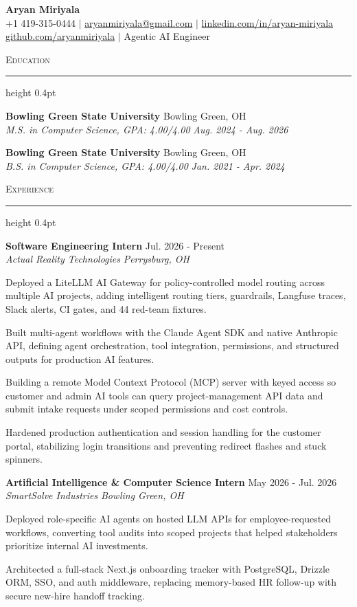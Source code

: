 \documentclass[letterpaper,11pt]{article}
\newcommand{\resumesection}[1]{%
  \par\vspace{2pt}%
  {\large\scshape #1}\par\vspace{2pt}%
  \hrule height 0.4pt\vspace{2pt}%
}
\newcommand{\resumeSubheading}[4]{
  \textbf{#1} \hfill #2\\
  \textit{#3} \hfill \textit{#4}
}
\begin{document}
\begin{center}
  {\LARGE \textbf{Aryan Miriyala}}\\[2pt]
  \small
  +1 419-315-0444 $|$ \href{mailto:aryanmiriyala@gmail.com}{aryanmiriyala@gmail.com} $|$ \href{https://www.linkedin.com/in/aryan-miriyala-7788a21b6/}{linkedin.com/in/aryan-miriyala}\\
  \href{https://github.com/aryanmiriyala}{github.com/aryanmiriyala} $|$ Agentic AI Engineer
\end{center}\vspace{-6pt}

\resumesection{Education}
\resumeSubheading
{Bowling Green State University}{Bowling Green, OH}
{M.S. in Computer Science, GPA: 4.00/4.00}{Aug. 2024 - Aug. 2026}

\resumeSubheading
{Bowling Green State University}{Bowling Green, OH}
{B.S. in Computer Science, GPA: 4.00/4.00}{Jan. 2021 - Apr. 2024}

\resumesection{Experience}
\resumeSubheading
{Software Engineering Intern}{Jul. 2026 - Present}
{Actual Reality Technologies}{Perrysburg, OH}
\begin{tightitemize}
  \item Deployed a LiteLLM AI Gateway for policy-controlled model routing across multiple AI projects, adding intelligent routing tiers, guardrails, Langfuse traces, Slack alerts, CI gates, and 44 red-team fixtures.
  \item Built multi-agent workflows with the Claude Agent SDK and native Anthropic API, defining agent orchestration, tool integration, permissions, and structured outputs for production AI features.
  \item Building a remote Model Context Protocol (MCP) server with keyed access so customer and admin AI tools can query project-management API data and submit intake requests under scoped permissions and cost controls.
  \item Hardened production authentication and session handling for the customer portal, stabilizing login transitions and preventing redirect flashes and stuck spinners.
\end{tightitemize}

\resumeSubheading
{Artificial Intelligence \& Computer Science Intern}{May 2026 - Jul. 2026}
{SmartSolve Industries}{Bowling Green, OH}
\begin{tightitemize}
  \item Deployed role-specific AI agents on hosted LLM APIs for employee-requested workflows, converting tool audits into scoped projects that helped stakeholders prioritize internal AI investments.
  \item Architected a full-stack Next.js onboarding tracker with PostgreSQL, Drizzle ORM, SSO, and auth middleware, replacing memory-based HR follow-up with secure new-hire handoff tracking.
\end{tightitemize}
\end{document}
